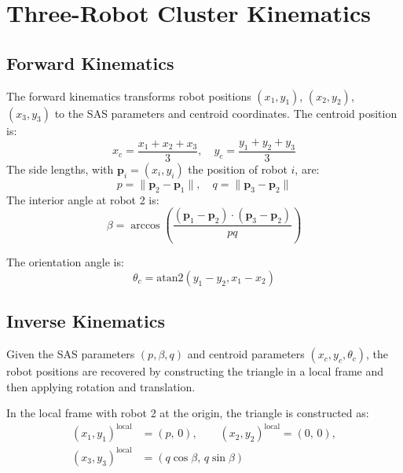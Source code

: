 \chapter{Three-Robot Cluster Kinematics}
\label{app:kin3}

\section{Forward Kinematics}

The forward kinematics transforms robot positions $(x_1, y_1)$, $(x_2, y_2)$, $(x_3, y_3)$ to the SAS parameters and centroid coordinates. The centroid position is:
\begin{equation}\label{eq:appB:20}
x_c = \frac{x_1 + x_2 + x_3}{3}, \quad y_c = \frac{y_1 + y_2 + y_3}{3}
\end{equation}
The side lengths, with $\mathbf{p}_i = (x_i, y_i)$ the position of robot $i$, are:
\begin{equation}\label{eq:appB:21}
p = \lVert \mathbf{p}_2 - \mathbf{p}_1 \rVert, \quad q = \lVert \mathbf{p}_3 - \mathbf{p}_2 \rVert
\end{equation}
The interior angle at robot 2 is:
\begin{equation}\label{eq:appB:23}
\beta = \arccos\left(\frac{(\mathbf{p}_1 - \mathbf{p}_2) \cdot (\mathbf{p}_3 - \mathbf{p}_2)}{pq}\right)
\end{equation}

The orientation angle is:
\begin{equation}\label{eq:appB:24}
\theta_c = \text{atan2}(y_1 - y_2, x_1 - x_2)
\end{equation}

\section{Inverse Kinematics}

Given the SAS parameters $(p, \beta, q)$ and centroid parameters $(x_c, y_c, \theta_c)$, the robot positions are recovered by constructing the triangle in a local frame and then applying rotation and translation.

In the local frame with robot 2 at the origin, the triangle is constructed as:
\begin{equation}\label{eq:appB:25}
\begin{aligned}
(x_1, y_1)^{\text{local}} &= (p,\, 0), \qquad (x_2, y_2)^{\text{local}} = (0,\, 0), \\
(x_3, y_3)^{\text{local}} &= (q\cos\beta,\, q\sin\beta)
\end{aligned}
\end{equation}

